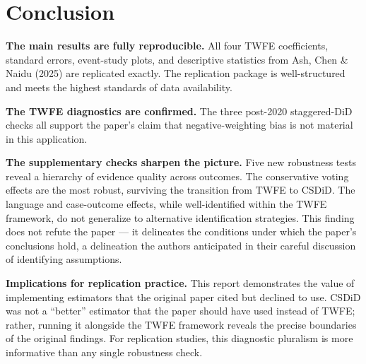 \documentclass[12pt,a4paper]{article}
\begin{document}
\section{Conclusion}
\label{sec:conclusion}

\textbf{The main results are fully reproducible.} All four TWFE coefficients, standard errors, event-study plots, and descriptive statistics from Ash, Chen \& Naidu (2025) are replicated exactly. The replication package is well-structured and meets the highest standards of data availability.

\textbf{The TWFE diagnostics are confirmed.} The three post-2020 staggered-DiD checks all support the paper's claim that negative-weighting bias is not material in this application.

\textbf{The supplementary checks sharpen the picture.} Five new robustness tests reveal a hierarchy of evidence quality across outcomes. The conservative voting effects are the most robust, surviving the transition from TWFE to CSDiD. The language and case-outcome effects, while well-identified within the TWFE framework, do not generalize to alternative identification strategies. This finding does not refute the paper --- it delineates the conditions under which the paper's conclusions hold, a delineation the authors anticipated in their careful discussion of identifying assumptions.

\textbf{Implications for replication practice.} This report demonstrates the value of implementing estimators that the original paper cited but declined to use. CSDiD was not a ``better'' estimator that the paper should have used instead of TWFE; rather, running it alongside the TWFE framework reveals the precise boundaries of the original findings. For replication studies, this diagnostic pluralism is more informative than any single robustness check.
\end{document}
